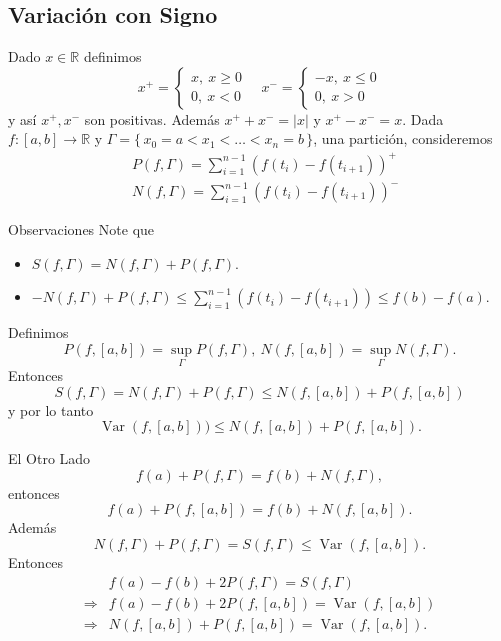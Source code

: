 \documentclass[utf8]{beamer}
\theoremstyle{plain}
\theoremstyle{definition}
\theoremstyle{remark}
\numberwithin{equation}{section}
\newcommand{\Ga}{\Gamma}                %
\newcommand{\bR}{\mathbb{R}}    %
\newcommand{\set}[1]{\{\,#1\,\}}    %
\renewcommand{\geq}{\geqslant}          %
\renewcommand{\leq}{\leqslant}          %
\newcommand{\To}{\Rightarrow}
\renewcommand{\.}{\Cdot}                %
\DeclareMathOperator{\Var}{Var}     %
\begin{document}
\subsection{Variación con Signo}

\begin{frame}
  Dado $x\in\bR$ definimos
  $$x^+=\begin{cases}
    x,\ x\geq 0\\
    0,\ x<0
  \end{cases}\quad
  x^-=\begin{cases}
    -x,\ x\leq 0\\
    0,\ x>0
  \end{cases}$$
  y así $x^+,x^-$ son positivas. Además $x^++x^-=|x|$ y $x^+-x^-=x$. Dada $f:[a,b]\to\bR$ y $\Ga=\set{x_0=a<x_1<\dots<x_n=b}$, una partición, consideremos
  \begin{align*}
    &P(f,\Ga)=\sum_{i=1}^{n-1}(f(t_i)-f(t_{i+1}))^+\\
    &N(f,\Ga)=\sum_{i=1}^{n-1}(f(t_i)-f(t_{i+1}))^-
  \end{align*}
\end{frame}

\begin{frame}{Observaciones}
  Note que 
  \begin{itemize}
    \item $S(f,\Ga)=N(f,\Ga)+P(f,\Ga)$.
    \item $-N(f,\Ga)+P(f,\Ga)\leq \sum_{i=1}^{n-1}(f(t_i)-f(t_{i+1}))\leq f(b)-f(a)$.
  \end{itemize}
  Definimos 
  $$P(f,[a,b])=\sup_\Ga P(f,\Ga),\ N(f,[a,b])=\sup_\Ga N(f,\Ga).$$
  Entonces
  $$S(f,\Ga)=N(f,\Ga)+P(f,\Ga)\leq N(f,[a,b])+P(f,[a,b])$$
  y por lo tanto 
  $$\Var(f,[a,b]))\leq N(f,[a,b])+P(f,[a,b]).$$
\end{frame}

\begin{frame}{El Otro Lado}
  $$f(a)+P(f,\Ga)=f(b)+N(f,\Ga),$$
  entonces
  $$f(a)+P(f,[a,b])=f(b)+N(f,[a,b]).$$
  Además 
  $$N(f,\Ga)+P(f,\Ga)=S(f,\Ga)\leq \Var(f,[a,b]).$$
  Entonces 
  \begin{align*}
    &f(a)-f(b)+2P(f,\Ga)=S(f,\Ga)\\
    \To&f(a)-f(b)+2P(f,[a,b])=\Var(f,[a,b])\\
    \To&N(f,[a,b])+P(f,[a,b])=\Var(f,[a,b]).
  \end{align*}
\end{frame}
\end{document}
